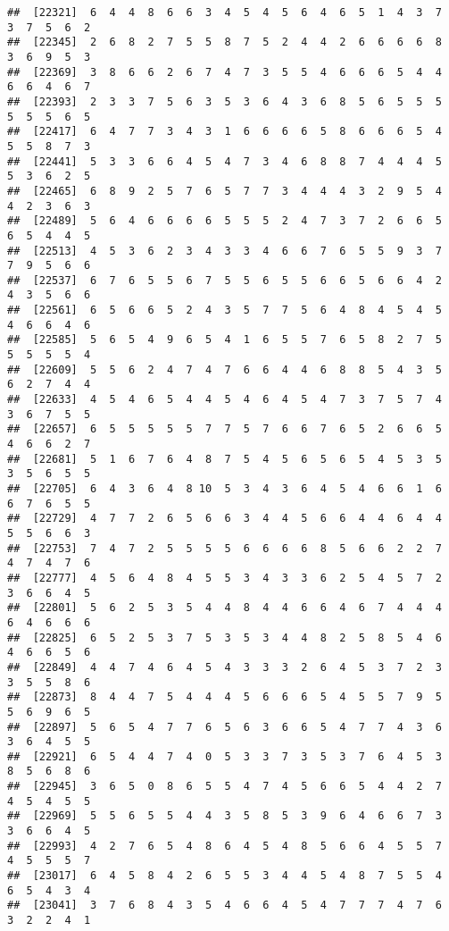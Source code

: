 \documentclass[
]{book}
\begin{document}
\begin{verbatim}
##  [22321]  6  4  4  8  6  6  3  4  5  4  5  6  4  6  5  1  4  3  7  3  7  5  6  2
##  [22345]  2  6  8  2  7  5  5  8  7  5  2  4  4  2  6  6  6  6  8  3  6  9  5  3
##  [22369]  3  8  6  6  2  6  7  4  7  3  5  5  4  6  6  6  5  4  4  6  6  4  6  7
##  [22393]  2  3  3  7  5  6  3  5  3  6  4  3  6  8  5  6  5  5  5  5  5  5  6  5
##  [22417]  6  4  7  7  3  4  3  1  6  6  6  6  5  8  6  6  6  5  4  5  5  8  7  3
##  [22441]  5  3  3  6  6  4  5  4  7  3  4  6  8  8  7  4  4  4  5  5  3  6  2  5
##  [22465]  6  8  9  2  5  7  6  5  7  7  3  4  4  4  3  2  9  5  4  4  2  3  6  3
##  [22489]  5  6  4  6  6  6  6  5  5  5  2  4  7  3  7  2  6  6  5  6  5  4  4  5
##  [22513]  4  5  3  6  2  3  4  3  3  4  6  6  7  6  5  5  9  3  7  7  9  5  6  6
##  [22537]  6  7  6  5  5  6  7  5  5  6  5  5  6  6  5  6  6  4  2  4  3  5  6  6
##  [22561]  6  5  6  6  5  2  4  3  5  7  7  5  6  4  8  4  5  4  5  4  6  6  4  6
##  [22585]  5  6  5  4  9  6  5  4  1  6  5  5  7  6  5  8  2  7  5  5  5  5  5  4
##  [22609]  5  5  6  2  4  7  4  7  6  6  4  4  6  8  8  5  4  3  5  6  2  7  4  4
##  [22633]  4  5  4  6  5  4  4  5  4  6  4  5  4  7  3  7  5  7  4  3  6  7  5  5
##  [22657]  6  5  5  5  5  5  7  7  5  7  6  6  7  6  5  2  6  6  5  4  6  6  2  7
##  [22681]  5  1  6  7  6  4  8  7  5  4  5  6  5  6  5  4  5  3  5  3  5  6  5  5
##  [22705]  6  4  3  6  4  8 10  5  3  4  3  6  4  5  4  6  6  1  6  6  7  6  5  5
##  [22729]  4  7  7  2  6  5  6  6  3  4  4  5  6  6  4  4  6  4  4  5  5  6  6  3
##  [22753]  7  4  7  2  5  5  5  5  6  6  6  6  8  5  6  6  2  2  7  4  7  4  7  6
##  [22777]  4  5  6  4  8  4  5  5  3  4  3  3  6  2  5  4  5  7  2  3  6  6  4  5
##  [22801]  5  6  2  5  3  5  4  4  8  4  4  6  6  4  6  7  4  4  4  6  4  6  6  6
##  [22825]  6  5  2  5  3  7  5  3  5  3  4  4  8  2  5  8  5  4  6  4  6  6  5  6
##  [22849]  4  4  7  4  6  4  5  4  3  3  3  2  6  4  5  3  7  2  3  3  5  5  8  6
##  [22873]  8  4  4  7  5  4  4  4  5  6  6  6  5  4  5  5  7  9  5  5  6  9  6  5
##  [22897]  5  6  5  4  7  7  6  5  6  3  6  6  5  4  7  7  4  3  6  3  6  4  5  5
##  [22921]  6  5  4  4  7  4  0  5  3  3  7  3  5  3  7  6  4  5  3  8  5  6  8  6
##  [22945]  3  6  5  0  8  6  5  5  4  7  4  5  6  6  5  4  4  2  7  4  5  4  5  5
##  [22969]  5  5  6  5  5  4  4  3  5  8  5  3  9  6  4  6  6  7  3  3  6  6  4  5
##  [22993]  4  2  7  6  5  4  8  6  4  5  4  8  5  6  6  4  5  5  7  4  5  5  5  7
##  [23017]  6  4  5  8  4  2  6  5  5  3  4  4  5  4  8  7  5  5  4  6  5  4  3  4
##  [23041]  3  7  6  8  4  3  5  4  6  6  4  5  4  7  7  7  4  7  6  3  2  2  4  1

\end{verbatim}
\end{document}
